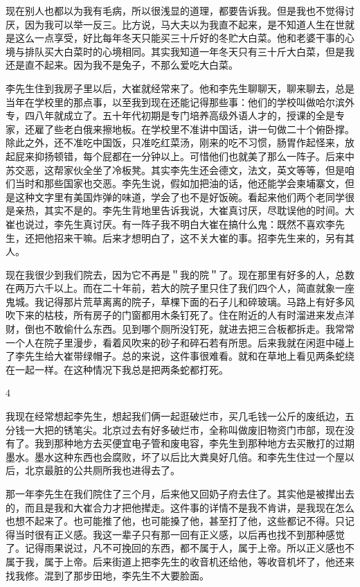 现在别人也都以为我有毛病，所以很浅显的道理，都要告诉我。但是我也不觉得讨厌，因为我可以举一反三。比方说，马大夫以为我直不起来，是不知道人生在世就是这么一点享受，好比每年冬天只能买三十斤好的冬贮大白菜。他和老婆干事的心境与排队买大白菜时的心境相同。其实我知道一年冬天只有三十斤大白菜，但是我还是直不起来。因为我不是兔子，不那么爱吃大白菜。 

李先生住到我房子里以后，大崔就经常来了。他和李先生聊聊天，聊来聊去，总是当年在学校里的那点事，以至我到现在还能记得那些事：他们的学校叫做哈尔滨外专，四八年就成立了。五十年代初期是专门培养高级外语人才的，授课的全是专家，还雇了些老白俄来擦地板。在学校里不准讲中国话，讲一句做二十个俯卧撑。除此之外，还不准吃中国饭，只准吃红菜汤，刚来的吃不习惯，肠胃作起怪来，放起屁来抑扬顿错，每个屁都在一分钟以上。可惜他们也就美了那么一阵子。后来中苏交恶，这帮家伙全坐了冷板凳。其实李先生还会德文，法文，英文等等，但是咱们当时和那些国家也交恶。李先生说，假如加把油的话，他还能学会柬埔寨文，但是这种文字里有美国炸弹的味道，学会了也不是好饭碗。看起来他们两个老同学很是亲热，其实不是的。李先生背地里告诉我说，大崔真讨厌，尽耽误他的时间。大崔也说过，李先生真讨厌。有一阵子我不明白大崔在搞什么鬼：既然不喜欢李先生，还把他招来干嘛。后来才想明白了，这不关大崔的事。招李先生来的，另有其人。 

现在我很少到我们院去，因为它不再是＂我的院＂了。现在那里有好多的人，总数在两万六千以上。而在二十年前，若大的院子里只住了我们四个人，简直就象一座鬼城。我记得那片荒草离离的院子，草棵下面的石子儿和碎玻璃。马路上有好多风吹下来的枯枝，所有房子的门窗都用木条钉死了。住在附近的人有时溜进来发点洋财，倒也不敢偷什么东西。见到哪个厕所没钉死，就进去把三合板都拆走。我常常一个人在院子里漫步，看着风吹来的砂子和碎石若有所思。后来我就在闲逛中碰上了李先生给大崔带绿帽子。总的来说，这件事很难看。就和在草地上看见两条蛇绕在一起一样。在这种情况下我总是把两条蛇都打死。 

4 

我现在经常想起李先生，想起我们俩一起逛破烂市，买几毛钱一公斤的废纸边，五分钱一大把的锈笔尖。北京过去有好多破烂市，全称叫做废旧物资门市部，现在没有了。我到那种地方去买便宜电子管和废电容，李先生到那种地方去买散打的过期墨水。墨水这种东西也会腐败，坏了以后比大粪臭好几倍。和李先生住过一个屋以后，北京最脏的公共厕所我也进得去了。 

那一年李先生在我们院住了三个月，后来他又回奶子府去住了。其实他是被撵出去的，而且是我和大崔合力才把他撵走。这件事的详情不是我不肯讲，是我现在怎么也想不起来了。也可能推了他，也可能搡了他，甚至打了他，这些都记不得。只记得当时很有正义感。我这一辈子只有那一回有正义感，以后再也找不到那种感觉了。记得雨果说过，凡不可挽回的东西，都不属于人，属于上帝。所以正义感也不属于我，属于上帝。后来街道上把李先生的收音机还给他，等收音机坏了，他还来找我修。混到了那步田地，李先生不大要脸面。 

